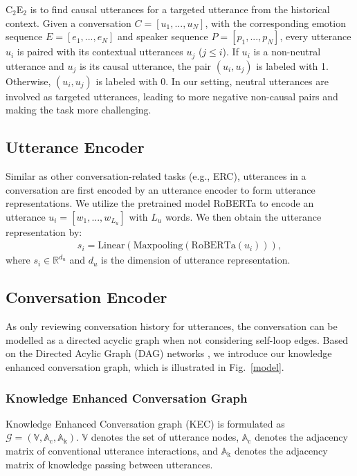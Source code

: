 \documentclass{article}
\begin{document}
C$_2$E$_2$ is to find causal utterances for a targeted utterance from the historical context. Given a conversation $C=[u_1,...,u_N]$, with the corresponding emotion sequence $E=[e_1,...,e_N]$ and speaker sequence  $P=[p_1,...,p_N]$, every utterance $u_i$ is paired with its contextual utterances $u_j$ ($j\leq i$). If $u_i$ is a non-neutral utterance and $u_j$ is its causal utterance, the pair $(u_i, u_j)$ is labeled with 1. Otherwise, $(u_i, u_j)$ is labeled with 0. In our setting, neutral utterances are involved as targeted utterances, leading to more negative non-causal pairs and making the task more challenging. 

\subsection{Utterance Encoder}

Similar as other conversation-related tasks (e.g., ERC), utterances in a conversation are first encoded by an utterance encoder to form utterance representations.  We utilize the pretrained model RoBERTa \cite{roberta} to encode an utterance $u_i=[w_1,...,w_{L_u}]$ with $L_u$ words. We then obtain the utterance representation by:
\begin{align}
    s_i=\mathrm{Linear}(\mathrm{Maxpooling}(\mathrm{RoBERTa}(u_i))),
\end{align}
where $s_i\in \mathbb{R}^{d_{u}}$ and $d_{u}$ is the dimension of utterance representation. 

\subsection{Conversation Encoder}

As only reviewing conversation history for utterances, the conversation can be modelled as a directed acyclic graph when not considering self-loop edges. Based on the Directed Acylic Graph (DAG) networks \cite{DAG}, we introduce our knowledge enhanced conversation graph, which is illustrated in Fig.~\ref{model}. 

\subsubsection{Knowledge Enhanced Conversation Graph}

Knowledge Enhanced Conversation graph (KEC) is formulated as $\mathcal{G}=(\mathbb{V}, \mathrm{\mathbb{A}_c}, \mathrm{\mathbb{A}_k})$. $\mathbb{V}$ denotes the set of utterance nodes, $\mathrm{\mathbb{A}_c}$ denotes the adjacency matrix of conventional utterance interactions, and $\mathrm{\mathbb{A}_k}$ denotes the adjacency matrix of knowledge passing between utterances. 
\end{document}
